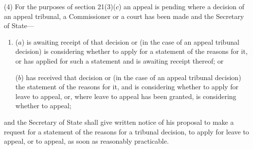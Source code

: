 \documentclass[12pt,a4paper]{article}
\begin{document}
%
%

(4) For the purposes of section 21(3)($c$)  an appeal is pending where a decision of an appeal tribunal, a Commissioner or a court has been made and the Secretary of State—
\begin{enumerate}\item[]
($a$) is awaiting receipt of that decision or (in the case of an appeal tribunal decision) is considering whether to apply for a statement of the reasons for it, or has applied for such a statement and is awaiting receipt thereof; or

($b$) has received that decision or (in the case of an appeal tribunal decision) the statement of the reasons for it, and is considering whether to apply for leave to appeal, or, where leave to appeal has been granted, is considering whether to appeal;
\end{enumerate}
and the Secretary of State shall give written notice of his proposal to make a request for a statement of the reasons for a tribunal decision, to apply for leave to appeal, or to appeal, as soon as reasonably practicable.

\end{document}

